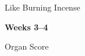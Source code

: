 \documentclass[oneside]{book}
\begin{document}
\null\vfill
\begin{center}
  \huge
  
  Like Burning Incense

  \bfseries\bigskip Weeks 3--4

  \LARGE\normalfont\bigskip Organ Score

\end{center}

\vfill\vfill
\end{document}
